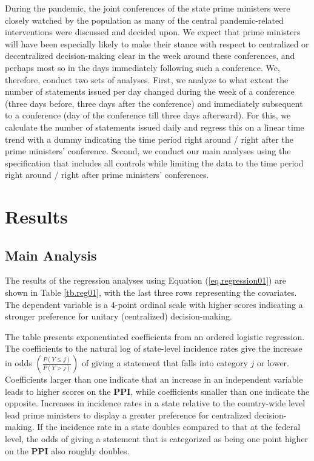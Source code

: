 \documentclass[authoryear,12pt, 3p]{elsarticle}
\theoremstyle{break}
\begin{document}
During the pandemic, the joint conferences of the state prime ministers were closely watched by the population as many of the central pandemic-related interventions were discussed and decided upon. We expect that prime ministers will have been especially likely to make their stance with respect to centralized or decentralized decision-making clear in the week around these conferences, and perhaps most so in the days immediately following such a conference. We, therefore, conduct two sets of analyses. First, we analyze to what extent the number of statements issued per day changed during the week of a conference (three days before, three days after the conference) and immediately subsequent to a conference (day of the conference till three days afterward). For this, we calculate the number of statements issued daily and regress this on a linear time trend with a dummy indicating the time period right around / right after the prime ministers' conference. Second, we conduct our main analyses using the specification that includes all controls while limiting the data to the time period right around / right after prime ministers' conferences.

\section{Results}\label{sec.results}
\subsection{Main Analysis}

The results of the regression analyses using Equation (\ref{eq.regression01}) are shown in Table \ref{tb.reg01}, with the last three rows representing the covariates. The dependent variable is a 4-point ordinal scale with higher scores indicating a stronger preference for unitary (centralized) decision-making.



The table presents exponentiated coefficients from an ordered logistic regression. The coefficients to the natural log of state-level incidence rates give the increase in odds $\left( \frac{P(Y \leq j)}{P(Y > j)} \right)$ of giving a statement that falls into category $j$ or lower. Coefficients larger than one indicate that an increase in an independent variable leads to higher scores on the \textbf{PPI}, while coefficients smaller than one indicate the opposite. Increases in incidence rates in a state relative to the country-wide level lead prime ministers to display a greater preference for centralized decision-making. If the incidence rate in a state doubles compared to that at the federal level, the odds of giving a statement that is categorized as being one point higher on the \textbf{PPI} also roughly doubles.
\end{document}

